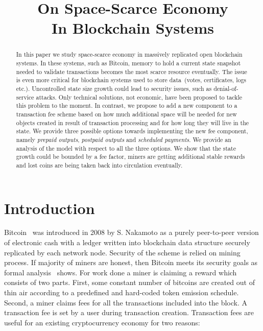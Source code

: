 \documentclass[]{llncs}   %
\newcommand{\authnote}[2]{\marginpar{\parbox{\marginparwidth}{\tiny %
  \textsf{#1 {\textcolor{blue}{notes: #2}}}}}%
  \textcolor{blue}{\textbf{\dag}}}
\newcommand{\authnote}[2]{
  \textsf{#1\textcolor{blue}{ #2}}}
\newcommand{\authnote}[2]{}
\newcommand{\knote}[1]{{\authnote{\textcolor{green}{Alex notes:}}{#1}}}
\begin{document}
\title{On Space-Scarce Economy\\ In Blockchain Systems}

\maketitle

\begin{abstract}

In this paper we study space-scarce economy in massively replicated open
blockchain systems. In these systems, such as Bitcoin, memory to hold a current
state snapshot needed to validate transactions becomes the most scarce resource
eventually. The issue is even more critical for blockchain systems used to store
data~(votes, certificates, logs etc.). Uncontrolled state size growth could lead
to security issues, such as denial-of-service attacks. Only technical solutions,
not economic, have been proposed to tackle this problem to the moment. In
contrast, we propose to add a new component to a transaction fee scheme based on
how much additional space will be needed for new objects created in result of
transaction processing and for how long they will live in the state. \knote{write abt fee adjustment rule} 
We provide three possible options towards implementing the new fee component, namely
\textit{prepaid outputs}, \textit{postpaid outputs} and \textit{scheduled
payments}. We provide an analysis of the model with respect to all the three
options. We show that the state growth could be bounded by a fee factor, miners
are getting additional stable rewards and lost coins are being taken back into
circulation eventually.    \knote{check this}

\end{abstract}

\section{Introduction}

Bitcoin~\cite{Nakamoto2008} was introduced in 2008 by S. Nakamoto as a purely
peer-to-peer version of electronic cash with a ledger written into blockchain
data structure securely replicated by each network node. Security of the scheme
is relied on mining process. If majority of miners are honest, then Bitcoin
meets its security goals as formal analysis~\cite{Garay2015} shows. For work
done a miner is claiming a reward which consists of two parts. First, some
constant number of bitcoins are created out of thin air according to a
predefined and hard-coded token emission schedule. Second, a miner claims fees
for all the transactions included into the block. A transaction fee is set by a
user during transaction creation. Transaction fees are useful for an existing
cryptocurrency economy for two reasons:
\end{document}

